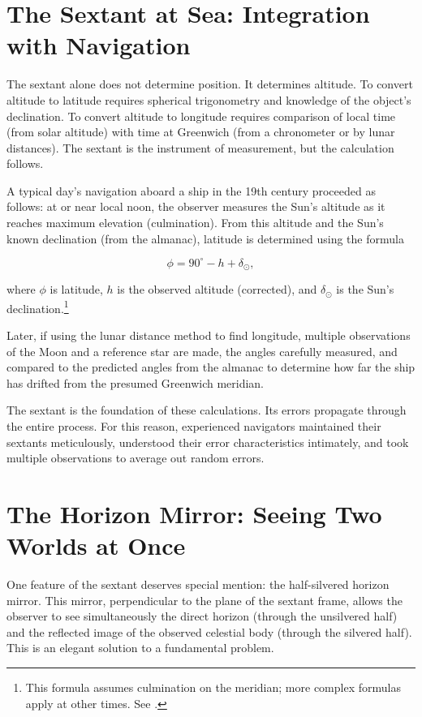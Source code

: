 \section{The Sextant at Sea: Integration with Navigation}

The sextant alone does not determine position. It determines altitude. To convert altitude to latitude requires spherical trigonometry and knowledge of the object's declination. To convert altitude to longitude requires comparison of local time (from solar altitude) with time at Greenwich (from a chronometer or by lunar distances). The sextant is the instrument of measurement, but the calculation follows.

A typical day's navigation aboard a ship in the 19th century proceeded as follows: at or near local noon, the observer measures the Sun's altitude as it reaches maximum elevation (culmination). From this altitude and the Sun's known declination (from the almanac), latitude is determined using the formula

\[
  \phi = 90^{\circ} - h + \delta_{\odot},
\]

where $\phi$ is latitude, $h$ is the observed altitude (corrected), and $\delta_{\odot}$ is the Sun's declination.\footnote{This formula assumes culmination on the meridian; more complex formulas apply at other times. See \textcite{Bowditch1802}.}

Later, if using the lunar distance method to find longitude, multiple observations of the Moon and a reference star are made, the angles carefully measured, and compared to the predicted angles from the almanac to determine how far the ship has drifted from the presumed Greenwich meridian.

The sextant is the foundation of these calculations. Its errors propagate through the entire process. For this reason, experienced navigators maintained their sextants meticulously, understood their error characteristics intimately, and took multiple observations to average out random errors.

\section{The Horizon Mirror: Seeing Two Worlds at Once}

One feature of the sextant deserves special mention: the half-silvered horizon mirror. This mirror, perpendicular to the plane of the sextant frame, allows the observer to see simultaneously the direct horizon (through the unsilvered half) and the reflected image of the observed celestial body (through the silvered half). This is an elegant solution to a fundamental problem.

